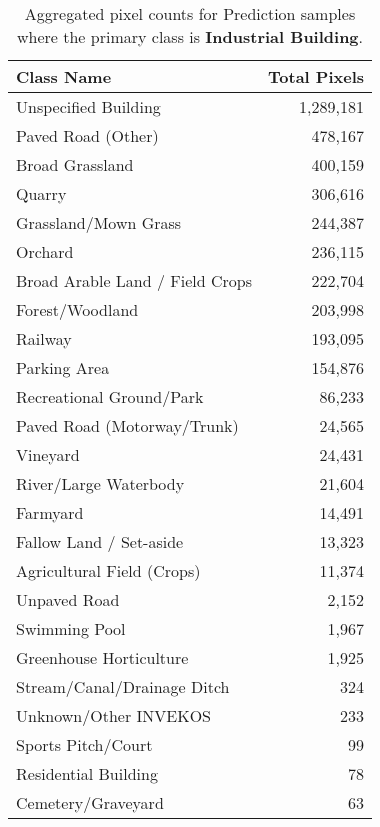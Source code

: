 \begin{table}[H] %
    \centering
    \caption{Aggregated pixel counts for Prediction samples where the primary class is \textbf{Industrial Building}.}
    \label{tab:pred_counts_3}
    \begin{tabular}{lr}
        \hline
        \textbf{Class Name} & \textbf{Total Pixels} \\
        \hline
        Unspecified Building & 1,289,181 \\
        Paved Road (Other) & 478,167 \\
        Broad Grassland & 400,159 \\
        Quarry & 306,616 \\
        Grassland/Mown Grass & 244,387 \\
        Orchard & 236,115 \\
        Broad Arable Land / Field Crops & 222,704 \\
        Forest/Woodland & 203,998 \\
        Railway & 193,095 \\
        Parking Area & 154,876 \\
        Recreational Ground/Park & 86,233 \\
        Paved Road (Motorway/Trunk) & 24,565 \\
        Vineyard & 24,431 \\
        River/Large Waterbody & 21,604 \\
        Farmyard & 14,491 \\
        Fallow Land / Set-aside & 13,323 \\
        Agricultural Field (Crops) & 11,374 \\
        Unpaved Road & 2,152 \\
        Swimming Pool & 1,967 \\
        Greenhouse Horticulture & 1,925 \\
        Stream/Canal/Drainage Ditch & 324 \\
        Unknown/Other INVEKOS & 233 \\
        Sports Pitch/Court & 99 \\
        Residential Building & 78 \\
        Cemetery/Graveyard & 63 \\
        \hline
    \end{tabular}
\end{table}

